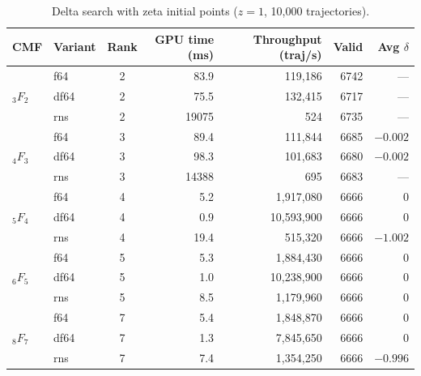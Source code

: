 \documentclass[11pt,a4paper]{article}
\begin{document}
\begin{table}[h]
\centering
\caption{Delta search with zeta initial points ($z=1$, 10{,}000 trajectories).}
\label{tab:zeta-delta}
\small
\begin{tabular}{llcrrrr}
\toprule
CMF & Variant & Rank & GPU time (ms) & Throughput (traj/s) & Valid & Avg $\delta$ \\
\midrule
\multirow{3}{*}{${}_3F_2$} & f64  & 2 & 83.9  & 119{,}186 & 6742 & --- \\
                           & df64 & 2 & 75.5  & 132{,}415 & 6717 & --- \\
                           & rns  & 2 & 19075 & 524       & 6735 & --- \\
\midrule
\multirow{3}{*}{${}_4F_3$} & f64  & 3 & 89.4  & 111{,}844 & 6685 & $-0.002$ \\
                           & df64 & 3 & 98.3  & 101{,}683 & 6680 & $-0.002$ \\
                           & rns  & 3 & 14388 & 695       & 6683 & --- \\
\midrule
\multirow{3}{*}{${}_5F_4$} & f64  & 4 & 5.2   & 1{,}917{,}080 & 6666 & 0 \\
                           & df64 & 4 & 0.9   & 10{,}593{,}900 & 6666 & 0 \\
                           & rns  & 4 & 19.4  & 515{,}320     & 6666 & $-1.002$ \\
\midrule
\multirow{3}{*}{${}_6F_5$} & f64  & 5 & 5.3   & 1{,}884{,}430 & 6666 & 0 \\
                           & df64 & 5 & 1.0   & 10{,}238{,}900 & 6666 & 0 \\
                           & rns  & 5 & 8.5   & 1{,}179{,}960 & 6666 & 0 \\
\midrule
\multirow{3}{*}{${}_8F_7$} & f64  & 7 & 5.4   & 1{,}848{,}870 & 6666 & 0 \\
                           & df64 & 7 & 1.3   & 7{,}845{,}650 & 6666 & 0 \\
                           & rns  & 7 & 7.4   & 1{,}354{,}250 & 6666 & $-0.996$ \\
\bottomrule
\end{tabular}
\end{table}
\end{document}
